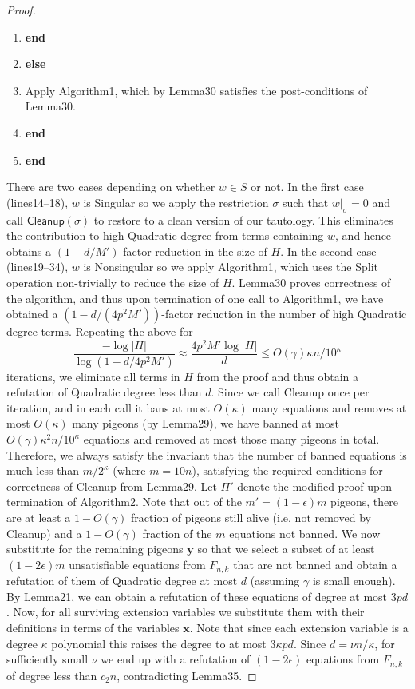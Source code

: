 \begin{proof}
\begin{enumerate}[label=\arabic*,leftmargin=*]
\item \textbf{end}
\item \textbf{else}
\item Apply Algorithm1, which by Lemma30 satisfies the post-conditions of Lemma30.
\item \textbf{end}
\item \textbf{end}
\end{enumerate}
There are two cases depending on whether $w\in S$ or not. In the first case (lines14–18), $w$ is Singular so we apply the restriction $\sigma$ such that $w|_{\sigma}=0$ and call $\mathsf{Cleanup}(\sigma)$ to restore to a clean version of our tautology. This eliminates the contribution to high Quadratic degree from terms containing $w$, and hence obtains a $(1-d/M')$-factor reduction in the size of $H$. In the second case (lines19–34), $w$ is Nonsingular so we apply Algorithm1, which uses the Split operation non-trivially to reduce the size of $H$. Lemma30 proves correctness of the algorithm, and thus upon termination of one call to Algorithm1, we have obtained a $(1-d/(4p^2M'))$-factor reduction in the number of high Quadratic degree terms.
Repeating the above for
\[\frac{-\log|H|}{\log(1-d/4p^2M')}\approx\frac{4p^2M'\log|H|}{d}\leq O(\gamma)\kappa n/10^{\kappa}\]
iterations, we eliminate all terms in $H$ from the proof and thus obtain a refutation of Quadratic degree less than $d$. Since we call Cleanup once per iteration, and in each call it bans at most $O(\kappa)$ many equations and removes at most $O(\kappa)$ many pigeons (by Lemma29), we have banned at most $O(\gamma)\kappa^2n/10^{\kappa}$ equations and removed at most those many pigeons in total. Therefore, we always satisfy the invariant that the number of banned equations is much less than $m/2^{\kappa}$ (where $m=10n$), satisfying the required conditions for correctness of Cleanup from Lemma29.
Let $\Pi'$ denote the modified proof upon termination of Algorithm2. Note that out of the $m'=(1-\epsilon)m$ pigeons, there are at least a $1-O(\gamma)$ fraction of pigeons still alive (i.e. not removed by Cleanup) and a $1-O(\gamma)$ fraction of the $m$ equations not banned. We now substitute for the remaining pigeons $\mathbf y$ so that we select a subset of at least $(1-2\epsilon)m$ unsatisfiable equations from $F_{n,k}$ that are not banned and obtain a refutation of them of Quadratic degree at most $d$ (assuming $\gamma$ is small enough). By Lemma21, we can obtain a refutation of these equations of degree at most $3pd$. Now, for all surviving extension variables we substitute them with their definitions in terms of the variables $\mathbf x$. Note that since each extension variable is a degree $\kappa$ polynomial this raises the degree to at most $3\kappa pd$. Since $d=\nu n/\kappa$, for sufficiently small $\nu$ we end up with a refutation of $(1-2\epsilon)$ equations from $F_{n,k}$ of degree less than $c_2n$, contradicting Lemma35.
\end{proof}
